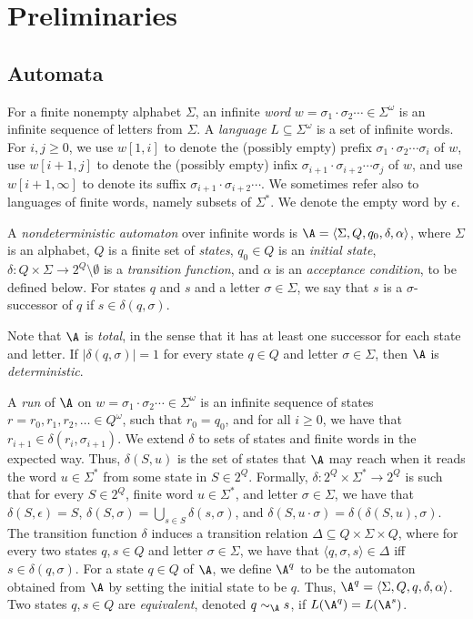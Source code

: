 \documentclass{lmcs}
\begin{document}
\section{Preliminaries}
\label{prelim}


\subsection{Automata}
For a finite nonempty alphabet $\Sigma$, an infinite {\em word\/} $w = \sigma_1 \cdot \sigma_2 \cdots \in \Sigma^\omega$ is an infinite sequence of letters from $\Sigma$. 
A {\em language\/} $L\subseteq \Sigma^\omega$ is a set of infinite words. For $i,j\geq 0$, we use $w[1, i]$ to denote the (possibly empty) prefix $\sigma_1\cdot \sigma_2 \cdots  \sigma_i$ of $w$, use $w[i+1, j]$ to denote the (possibly empty) infix $\sigma_{i+1}\cdot \sigma_{i+2} \cdots \sigma_j$ of $w$, and use $w[i+1, \infty]$ to denote its suffix $\sigma_{i+1} \cdot  \sigma_{i+2} \cdots$. We sometimes refer also to languages of finite words, namely subsets of $\Sigma^*$. We denote the empty word by $\epsilon$.

A \emph{nondeterministic automaton} over infinite words is $\A = \langle \Sigma, Q, q_0, \delta, \alpha  \rangle$, where $\Sigma$ is an alphabet, $Q$ is a finite set of \emph{states}, $q_0\in Q$ is an \emph{initial state}, $\delta: Q\times \Sigma \to 2^Q \setminus \emptyset$ is a \emph{transition function}, and $\alpha$ is an \emph{acceptance condition}, to be defined below. 
For states $q$ and $s$ and a letter $\sigma \in \Sigma$, we say that $s$ is a $\sigma$-successor of $q$ if $s \in \delta(q,\sigma)$.

Note that $\A$ is \emph{total}, in the sense that it has at least one successor for each state and letter.
If $|\delta(q, \sigma)| = 1$ for every state $q\in Q$ and letter $\sigma \in \Sigma$, then $\A$ is \emph{deterministic}.


A \emph{run}  of $\A$ on $w = \sigma_1 \cdot \sigma_2 \cdots \in \Sigma^\omega$ is an infinite sequence of states $r = r_0,r_1,r_2,\ldots \in Q^\omega$, such that $r_0 = q_0$, and for all $i \geq 0$, we have that $r_{i+1} \in \delta(r_i, \sigma_{i+1})$. 
We extend $\delta$ to sets of states and finite words in the expected way. Thus, $\delta(S, u)$ is the set of states that $\A$ may reach when it reads the word $u \in \Sigma^*$ from some state in $S \in 2^Q$. Formally, $\delta: 2^Q\times \Sigma^* \to 2^Q$ is such that for every $S \in 2^Q$, finite word $u\in \Sigma^*$, and letter $\sigma\in \Sigma$, we have that $\delta(S, \epsilon) = S$, $\delta(S, \sigma) = \bigcup_{s\in S}\delta(s, \sigma)$, and $\delta(S, u \cdot \sigma) = \delta(\delta(S, u), \sigma)$. 
The transition function $\delta$ induces a transition relation $\Delta \subseteq Q\times \Sigma \times Q$, where for every two states $q,s\in Q$ and letter $\sigma\in \Sigma$, we have that $\langle q, \sigma, s \rangle \in \Delta$ iff $s\in \delta(q, \sigma)$. 
For a state $q\in Q$ of $\A$, we define $\A^q$ to be the automaton obtained from $\A$ by setting the initial state to be $q$. Thus, $\A^q = \langle \Sigma, Q, q, \delta, \alpha \rangle$. Two states $q,s\in Q$ are \emph{equivalent}, denoted $q \sim_{\A} s$, if $L(\A^q) = L(\A^s)$. 
\end{document}
